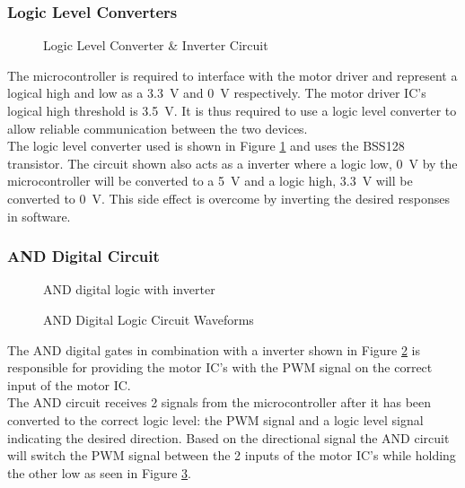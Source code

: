 \subsubsection{Logic Level Converters}
\begin{figure}[h]
	\centering
	
	\caption{Logic Level Converter \& Inverter Circuit}
	\label{fig:interterCirc}
\end{figure}


The microcontroller is required to interface with the motor driver and represent a logical high and low as a \SI{3.3}{V} and \SI{0}{V} respectively. The motor driver IC's logical high threshold is \SI{3.5}{V}. It is thus required to use a logic level converter to allow reliable communication between the two devices.\\

The logic level converter used is shown in Figure \ref{fig:interterCirc} and uses the BSS128 transistor. The circuit shown also acts as a inverter where a logic low, \SI{0}{V} by the microcontroller will be converted to a \SI{5}{V} and a logic high, \SI{3.3}{V} will be converted to \SI{0}{V}. This side effect is overcome by inverting the desired responses in software.


\subsubsection{AND Digital Circuit}
\begin{figure}[h]
	\centering
	
	\caption{AND digital logic with inverter}
	\label{fig:andCircuit}
\end{figure}

\begin{figure}[h]
	\centering
	
	\caption{AND Digital Logic Circuit Waveforms}
	\label{fig:andCircuit_waveform}
\end{figure}

The AND digital gates in combination with a inverter shown in Figure \ref{fig:andCircuit} is responsible for providing the motor IC's with the PWM signal on the correct input of the motor IC.\\ 

The AND circuit receives 2 signals from the microcontroller  after it has been converted to the correct logic level: the PWM signal and a logic level signal indicating the desired direction. Based on the directional signal the AND circuit will switch the PWM signal between the 2 inputs of the motor IC's while holding the other low as seen in Figure \ref{fig:andCircuit_waveform}.\\

